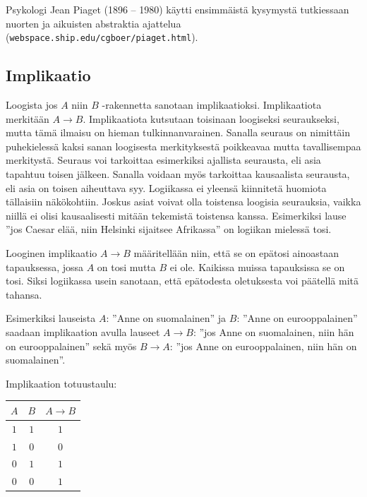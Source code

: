 Psykologi Jean Piaget (1896 -- 1980) käytti ensimmäistä kysymystä tutkiessaan nuorten ja aikuisten abstraktia ajattelua ({\tt webspace.ship.edu/cgboer/piaget.html}).

\subsection*{Implikaatio}

Loogista jos $A$ niin $B$ -rakennetta sanotaan implikaatioksi. Implikaatiota merkitään $A\to B$. Implikaatiota  kutsutaan toisinaan loogiseksi seu\-rauk\-sek\-si, mutta tämä ilmaisu on hieman tulkinnanvarainen. Sanalla seuraus on nimittäin puhekielessä kaksi sanan loogisesta merkityksestä poikkeavaa mutta tavallisempaa merkitystä. Seuraus voi tarkoittaa esimerkiksi ajallista seurausta, eli asia tapahtuu toisen jälkeen. Sanalla voidaan myös tarkoittaa kausaalista seurausta, eli asia on toisen aiheuttava syy. Logiikassa ei yleensä kiinnitetä huomiota tällaisiin näkökohtiin. Joskus asiat voivat olla toistensa loogisia seurauksia, vaikka niillä ei olisi kausaalisesti mitään tekemistä toistensa kanssa. Esimerkiksi lause ''jos Caesar elää, niin Helsinki sijaitsee Afrikassa'' on logiikan mielessä tosi. 

Looginen implikaatio $A\to B$  määritellään niin, että se on epätosi ainoastaan tapauksessa, jossa $A$ on tosi mutta $B$ ei ole. Kaikissa muissa tapauksissa se on tosi. Siksi logiikassa usein sanotaan, että epätodesta oletuksesta voi päätellä mitä tahansa.


Esimerkiksi lauseista $A$: ''Anne on suomalainen'' ja $B$: ''Anne on eurooppalainen'' saadaan implikaation avulla lauseet $A \to B$: ''jos Anne on suomalainen, niin hän on eurooppalainen'' sekä myös $B \to A$: ''jos Anne on eurooppalainen, niin hän on suomalainen''. 

Implikaation totuustaulu:

\bigskip

\begin{center}
\begin{tabular}{|c|c|c|}\hline
$A$ & $B$ & $A \to B$ \\ \hline
$1$ & $1$ & $1$\\ %
$1$ & $0$ & $0$\\
$0$ & $1$ & $1$\\
$0$ & $0$ & $1$\\ \hline
\end{tabular}
\end{center}

